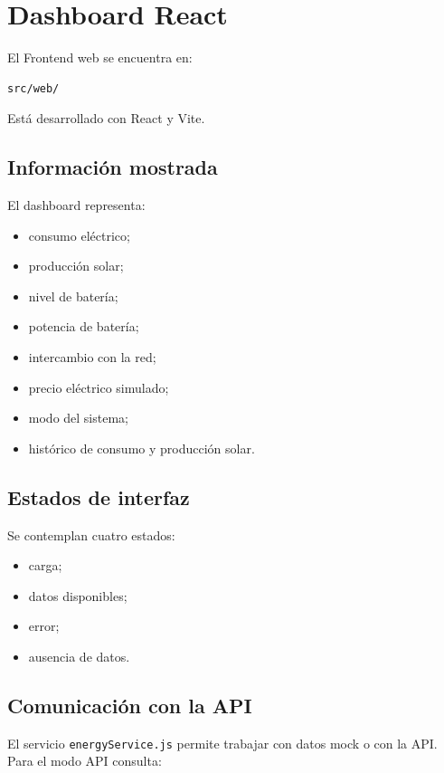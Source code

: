 \documentclass[11pt,a4paper,oneside]{report}
\begin{document}
\section{Dashboard React}

El Frontend web se encuentra en:

\begin{verbatim}
src/web/
\end{verbatim}

Está desarrollado con React y Vite.

\subsection{Información mostrada}

El dashboard representa:

\begin{itemize}
\item consumo eléctrico;
\item producción solar;
\item nivel de batería;
\item potencia de batería;
\item intercambio con la red;
\item precio eléctrico simulado;
\item modo del sistema;
\item histórico de consumo y producción solar.
\end{itemize}

\subsection{Estados de interfaz}

Se contemplan cuatro estados:

\begin{itemize}
\item carga;
\item datos disponibles;
\item error;
\item ausencia de datos.
\end{itemize}

\subsection{Comunicación con la API}

El servicio \texttt{energyService.js} permite trabajar con datos mock o con la API. Para el modo API consulta:
\end{document}
